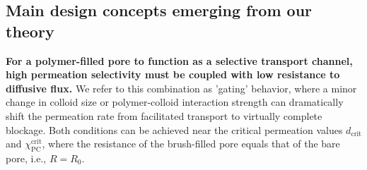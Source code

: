 \documentclass[12pt, a4paper]{article}
\begin{document}




\subsection{Main design concepts emerging from our theory}

\textbf{For a polymer-filled pore to function as a selective transport channel, high permeation selectivity must be coupled with low resistance to diffusive flux.}
We refer to this combination as 'gating' behavior, where a minor change in colloid size or polymer-colloid interaction strength can dramatically shift the permeation rate from facilitated transport to virtually complete blockage.
Both conditions can be achieved near the critical permeation values $d_{\text{crit}}$ and $\chi_{\text{PC}}^{\text{crit}}$, where the resistance of the brush-filled pore equals that of the bare pore, i.e., $R = R_{0}$.
\end{document}
